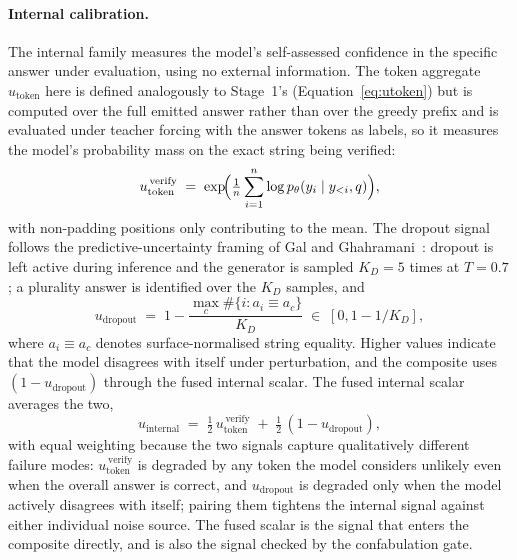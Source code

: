 \paragraph{Internal calibration.}
The internal family measures the model's self-assessed confidence in the specific answer under evaluation, using no external information. The token aggregate $u_{\text{token}}$ here is defined analogously to Stage~1's (Equation~\ref{eq:utoken}) but is computed over the full emitted answer rather than over the greedy prefix and is evaluated under teacher forcing with the answer tokens as labels, so it measures the model's probability mass on the exact string being verified:
\begin{equation}
u_{\text{token}}^{\,\text{verify}} \;=\; \exp\!\Bigl(\tfrac{1}{n}\sum_{i=1}^{n} \log p_{\theta}(y_{i} \mid y_{<i}, q)\Bigr),
\label{eq:utoken-verify}
\end{equation}
with non-padding positions only contributing to the mean. The dropout signal follows the predictive-uncertainty framing of Gal and Ghahramani~\cite{pmlr-v48-gal16}: dropout is left active during inference and the generator is sampled $K_{D} = 5$ times at $T = 0.7$; a plurality answer is identified over the $K_{D}$ samples, and
\begin{equation}
u_{\text{dropout}} \;=\; 1 - \frac{\max_{c} \#\{i : a_{i} \equiv a_{c}\}}{K_{D}} \;\in\; [0, 1 - 1/K_{D}],
\label{eq:udropout}
\end{equation}
where $a_{i} \equiv a_{c}$ denotes surface-normalised string equality. Higher values indicate that the model disagrees with itself under perturbation, and the composite uses $(1 - u_{\text{dropout}})$ through the fused internal scalar. The fused internal scalar averages the two,
\begin{equation}
u_{\text{internal}} \;=\; \tfrac{1}{2}\,u_{\text{token}}^{\,\text{verify}} \;+\; \tfrac{1}{2}\,(1 - u_{\text{dropout}}),
\label{eq:uinternal}
\end{equation}
with equal weighting because the two signals capture qualitatively different failure modes: $u_{\text{token}}^{\,\text{verify}}$ is degraded by any token the model considers unlikely even when the overall answer is correct, and $u_{\text{dropout}}$ is degraded only when the model actively disagrees with itself; pairing them tightens the internal signal against either individual noise source. The fused scalar is the signal that enters the composite directly, and is also the signal checked by the confabulation gate.

